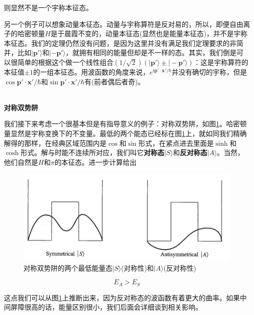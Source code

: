 \documentclass[UTF8,twoside]{ctexart}
\begin{document}
\noindent 则显然不是一个宇称本征态。

另一个例子可以想象动量本征态。动量与宇称算符是反对易的，所以，即便自由离子的哈密顿量$H$是于晨霞不变的，动量本征态(显然也是能量本征态)，并不是宇称本征态。我们的定理仍然没有问题，是因为这里并没有满足我们定理要求的非简并，比如$|\bm{p}'\rangle$和$|-\bm{p}'\rangle$，就拥有相同的能量但却是不一样的态。其实，我们倒是可以很简单的根据这个做一个线性组合$(1/\sqrt{2})(|\bm{p}'\rangle\pm|-\bm{p}'\rangle)$：这是宇称算符的本征值$\pm 1$的一组本征态。用波函数的角度来说，$e^{i\bm{p}'\cdot\bm{x}'/\hbar}$并没有确切的宇称，但是$\cos \bm{p}'\cdot\bm{x}'/\hbar$和$\sin \bm{p}'\cdot\bm{x}'/\hbar$有(前者偶后者奇)。

\ \\

\noindent \textbf{对称双势阱}

\noindent 我们接下来考虑一个很基本但是有指导意义的例子：对称双势阱，如图{\ref{Fig4.3}}。哈密顿量显然是宇称变换下的不变量。最低的两个能态已经标在图{\ref{Fig4.3}}上，就如同我们精确解得的那样，在经典区域范围内是$\cos$和$\sin$形式，在紧点进去里面是$\sinh$和$\cosh$形式。解与时能不连续所对应，我们叫它{\textbf{对称态}}$|S\rangle$和{\textbf{反对称态}}$|A\rangle$。当然，他们自然是$H$和$\pi$的本征态。进一步计算给出

\begin{figure}
\begin{centering}
\includegraphics[width = 12.4cm]{./Sakurai/Fig_4.3.png}
\caption{对称双势阱的两个最低能量态$|S\rangle$(对称性)和$|A\rangle$(反对称性)}
\label {Fig4.3}
\end{centering}
\end{figure}

\begin{equation}
E_A>E_S
\end{equation}

\noindent 这点我们可以从图{\ref{Fig4.3}}上推断出来，因为反对称态的波函数有着更大的曲率。如果中间屏障很高的话，能量区别很小，我们后面会详细谈到相关影响。
\end{document}
